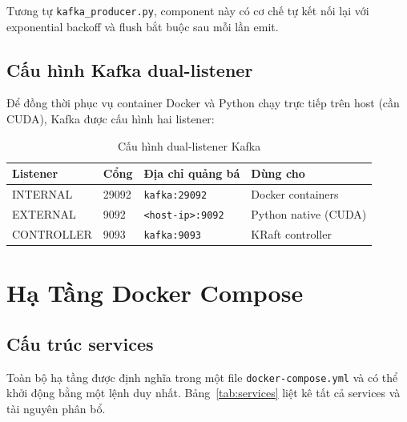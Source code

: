 \documentclass[12pt,a4paper]{article}
\begin{document}
\noindent Tương tự \texttt{kafka\_producer.py}, component này có cơ chế tự kết nối lại với exponential backoff và flush bắt buộc sau mỗi lần emit.

\subsection{Cấu hình Kafka dual-listener}

Để đồng thời phục vụ container Docker và Python chạy trực tiếp trên host (cần CUDA), Kafka được cấu hình hai listener:

\begin{table}[H]
\centering
\caption{Cấu hình dual-listener Kafka}
\label{tab:kafka_listener}
\begin{tabular}{llll}
\toprule
\textbf{Listener} & \textbf{Cổng} & \textbf{Địa chỉ quảng bá} & \textbf{Dùng cho} \\
\midrule
INTERNAL & 29092 & \texttt{kafka:29092} & Docker containers \\
EXTERNAL & 9092  & \texttt{<host-ip>:9092} & Python native (CUDA) \\
CONTROLLER & 9093 & \texttt{kafka:9093} & KRaft controller \\
\bottomrule
\end{tabular}
\end{table}

\section{Hạ Tầng Docker Compose}

\subsection{Cấu trúc services}

Toàn bộ hạ tầng được định nghĩa trong một file \texttt{docker-compose.yml} và có thể khởi động bằng một lệnh duy nhất. Bảng~\ref{tab:services} liệt kê tất cả services và tài nguyên phân bổ.
\end{document}

